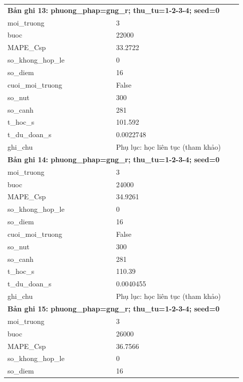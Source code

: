 \begin{longtable}{p{0.43\linewidth}p{0.50\linewidth}}
\midrule
\multicolumn{2}{p{0.95\linewidth}}{\textbf{Bản ghi 13: phuong\_phap=gng\_r; thu\_tu=1-2-3-4; seed=0}} \\
moi\_\allowbreak truong & 3 \\
buoc & 22000 \\
MAPE\_\allowbreak Csp & 33.2722 \\
so\_\allowbreak khong\_\allowbreak hop\_\allowbreak le & 0 \\
so\_\allowbreak diem & 16 \\
cuoi\_\allowbreak moi\_\allowbreak truong & False \\
so\_\allowbreak nut & 300 \\
so\_\allowbreak canh & 281 \\
t\_\allowbreak hoc\_\allowbreak s & 101.592 \\
t\_\allowbreak du\_\allowbreak doan\_\allowbreak s & 0.0022748 \\
ghi\_\allowbreak chu & Phụ lục: học liên tục (tham khảo) \\
\midrule
\multicolumn{2}{p{0.95\linewidth}}{\textbf{Bản ghi 14: phuong\_phap=gng\_r; thu\_tu=1-2-3-4; seed=0}} \\
moi\_\allowbreak truong & 3 \\
buoc & 24000 \\
MAPE\_\allowbreak Csp & 34.9261 \\
so\_\allowbreak khong\_\allowbreak hop\_\allowbreak le & 0 \\
so\_\allowbreak diem & 16 \\
cuoi\_\allowbreak moi\_\allowbreak truong & False \\
so\_\allowbreak nut & 300 \\
so\_\allowbreak canh & 281 \\
t\_\allowbreak hoc\_\allowbreak s & 110.39 \\
t\_\allowbreak du\_\allowbreak doan\_\allowbreak s & 0.0040455 \\
ghi\_\allowbreak chu & Phụ lục: học liên tục (tham khảo) \\
\midrule
\multicolumn{2}{p{0.95\linewidth}}{\textbf{Bản ghi 15: phuong\_phap=gng\_r; thu\_tu=1-2-3-4; seed=0}} \\
moi\_\allowbreak truong & 3 \\
buoc & 26000 \\
MAPE\_\allowbreak Csp & 36.7566 \\
so\_\allowbreak khong\_\allowbreak hop\_\allowbreak le & 0 \\
so\_\allowbreak diem & 16 \\

\end{longtable}
